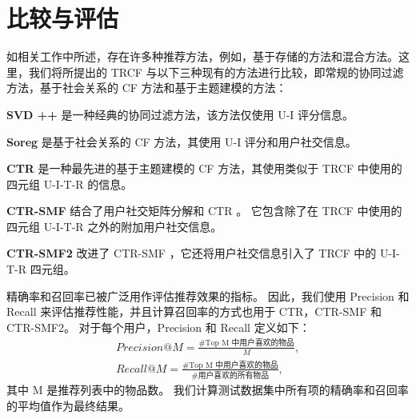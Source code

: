 \section{比较与评估}
如相关工作中所述，存在许多种推荐方法，例如，基于存储的方法和混合方法。这里，我们将所提出的 TRCF 与以下三种现有的方法进行比较，即常规的协同过滤方法，基于社会关系的 CF 方法和基于主题建模的方法：


\textbf{SVD ++} \cite{Koren2008Factorization} 是一种经典的协同过滤方法，该方法仅使用 U-I 评分信息。

\textbf{Soreg} \cite{Ma2011Recommender} 是基于社会关系的 CF 方法，其使用 U-I 评分和用户社交信息。

\textbf{CTR} \cite{Wang2011Collaborative} 是一种最先进的基于主题建模的 CF 方法，其使用类似于 TRCF 中使用的四元组 U-I-T-R 的信息。

\textbf{CTR-SMF} \cite{purushotham2012collaborative} 结合了用户社交矩阵分解和 CTR 。 它包含除了在 TRCF 中使用的四元组 U-I-T-R 之外的附加用户社交信息。

\textbf{CTR-SMF2} \cite{Chen2014Context} 改进了 CTR-SMF ，它还将用户社交信息引入了 TRCF 中的 U-I-T-R 四元组。

精确率和召回率已被广泛用作评估推荐效果的指标\cite{herlocker2004evaluating}。 因此，我们使用 Precision 和 Recall 来评估推荐性能，并且计算召回率的方式也用于 CTR，CTR-SMF 和 CTR-SMF2。 对于每个用户，Precision 和 Recall 定义如下：
\begin{equation}
\begin{aligned}
Precision@M = \frac{\# \text{Top M 中用户喜欢的物品}}{M},  \\
Recall@M = \frac{\# \text{Top M 中用户喜欢的物品}} {\# \text{用户喜欢的所有物品}}, 
\end{aligned}
\end{equation}
其中 M 是推荐列表中的物品数。 我们计算测试数据集中所有项的精确率和召回率的平均值作为最终结果。

